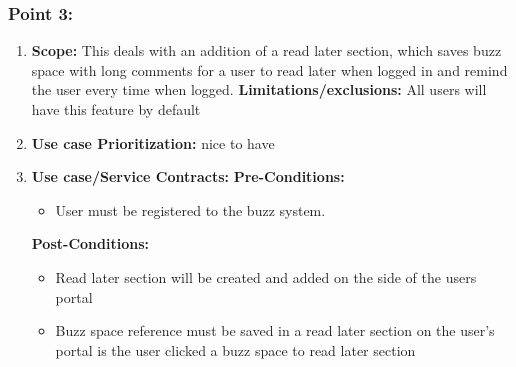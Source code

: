 \documentclass[11pt]{article}
\begin{document}
\subsubsection{Point 3:} 
\begin{enumerate}
\item 
\textbf{Scope:}
This deals with an addition of a read later section, which saves buzz space with long comments for a user to read later when logged in and remind the user every time when logged.
\newline
\textbf{Limitations/exclusions:} 
All users will have this feature by default
\item 
\textbf{Use case Prioritization:} nice to have

\item 
\textbf{Use case/Service Contracts:} 
\newline
\textbf{Pre-Conditions: }
\begin{itemize}
\item User must be registered to the buzz system.
\end{itemize}
 

\textbf{Post-Conditions: }
\begin{itemize}
\item Read later section will be created and added on the side of the users portal
\item Buzz space reference must be saved in a read later section on the user's portal is the user clicked a buzz space to read later section 
\end{itemize}
\end{enumerate}
\end{document}
